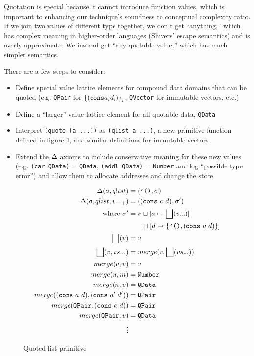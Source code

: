 \documentclass[preprint,onecolumn,9pt]{sigplanconf} %
\begin{document}
Quotation is special because it cannot introduce function values,
which is important to enhancing our technique's soundness to
conceptual complexity ratio. If we join two values of different type
together, we don't get ``anything,'' which has complex meaning in
higher-order languages (Shivers' escape semantics) and is overly
approximate. We instead get ``any quotable value,'' which has much
simpler semantics.

There are a few steps to consider:
\begin{itemize}
 \item{Define special value lattice elements for compound data domains that can be quoted
       (e.g. {\tt QPair} for $\left\{ ({\tt cons} a_i d_i)\right\}_i$, {\tt QVector} for immutable vectors, etc.)}
 \item{Define a ``larger'' value lattice element for all quotable data, {\tt QData}}
 \item{Interpret {\tt (quote (a ...))} as {\tt (qlist a ...)}, a new primitive function defined in figure \ref{fig:qlist},
       and similar definitions for immutable vectors.}
 \item{Extend the $\Delta$ axioms to include conservative
   meaning for these new values (e.g. {\tt (car QData)} = {\tt QData},
   {\tt (add1 QData)} = {\tt Number} and log ``possible type error'')
   and allow them to allocate addresses and change the store}
\end{itemize}

\begin{figure}
\begin{align*}
\Delta(\sigma, qlist) &= (\mbox{{\tt '()}}, \sigma) \\
\Delta(\sigma, qlist, v ..._+) &= (({\tt cons}\ a\ d), \sigma') \\
\qquad \mbox{where } \sigma' &= \sigma\sqcup[a \mapsto \bigsqcup(v ...)] \\
                            &\qquad \sqcup[d \mapsto \{ \mbox{{\tt '()}}, ({\tt cons}\ a\ d)\}] \\
\bigsqcup(v) &= v \\
\bigsqcup(v, vs ...) &= merge(v, \bigsqcup(vs ...)) \\
merge(v, v) &= v \\
merge(n, m) &= {\tt Number} \\
merge(n, v) &= {\tt QData} \\
merge(({\tt cons}\ a\ d), ({\tt cons}\ a'\ d')) &= {\tt QPair} \\
merge({\tt QPair}, ({\tt cons}\ a\ d)) &= {\tt QPair} \\
merge({\tt QPair}, v) &= {\tt QData} \\
\vdots
\end{align*}
\caption{Quoted list primitive}
\label{fig:qlist}
\end{figure}
\end{document}
